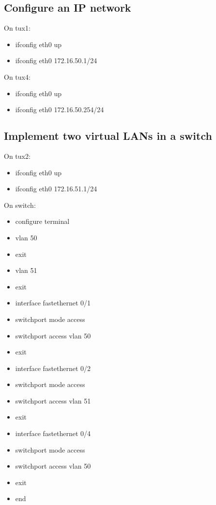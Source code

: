 \documentclass[11pt,a4paper,reqno]{article}
\numberwithin{equation}{section}
\begin{document}
\begin{appendices}
\subsection{Configure an IP network}

On tux1:
\begin{itemize}[label=-]
\item ifconfig eth0 up
\item ifconfig eth0 172.16.50.1/24
\end{itemize}

On tux4:
\begin{itemize}[label=-]
\item ifconfig eth0 up
\item ifconfig eth0 172.16.50.254/24
\end{itemize}

\subsection{Implement two virtual LANs in a switch}

On tux2:
\begin{itemize}[label=-]
\item ifconfig eth0 up
\item ifconfig eth0 172.16.51.1/24
\end{itemize}

On switch:
\begin{itemize}[label=-]
\item configure terminal
\item vlan 50
\item exit
\item vlan 51
\item exit
\item interface fastethernet 0/1
\item switchport mode access
\item switchport access vlan 50
\item exit
\item interface fastethernet 0/2
\item switchport mode access
\item switchport access vlan 51
\item exit
\item interface fastethernet 0/4
\item switchport mode access
\item switchport access vlan 50
\item exit
\item end
\end{itemize}


\end{appendices}
\end{document}
